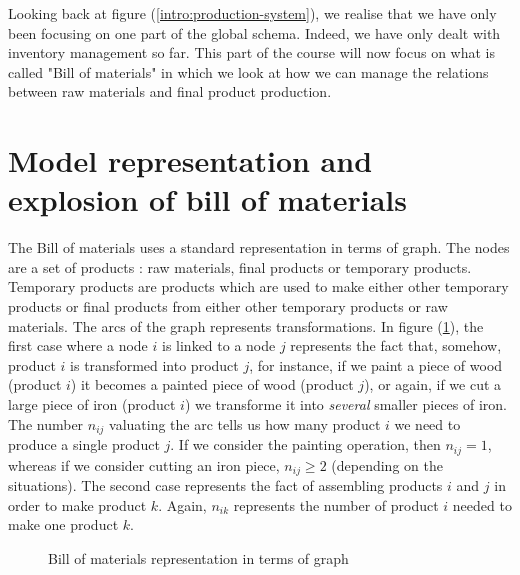 Looking back at figure (\ref{intro:production-system}), we realise that we have only been focusing on one part of the global schema. Indeed, we have only dealt with inventory management so far. This part of the course will now focus on what is called "Bill of materials" in which we look at how we can manage the relations between raw materials and final product production.

\section{Model representation and explosion of bill of materials}

The Bill of materials uses a standard representation in terms of graph. The nodes are a set of products : raw materials, final products or temporary products. Temporary products are products which are used to make either other temporary products or final products from either other temporary products or raw materials. The arcs of the graph represents transformations. In figure (\ref{without_st:representation}), the first case where a node $i$ is linked to a node $j$ represents the fact that, somehow, product $i$ is transformed into product $j$, for instance, if we paint a piece of wood (product $i$) it becomes a painted piece of wood (product $j$), or again, if we cut a large piece of iron (product $i$) we transforme it into \emph{several} smaller pieces of iron. The number $n_{ij}$ valuating the arc tells us how many product $i$ we need to produce a single product $j$. If we consider the painting operation, then $n_{ij}=1$, whereas if we consider cutting an iron piece, $n_{ij}\ge 2$ (depending on the situations). The second case represents the fact of assembling products $i$ and $j$ in order to make product $k$. Again, $n_{ik}$ represents the number of product $i$ needed to make one product $k$.

\begin{figure}[h!]
    \centering
    \caption{\label{without_st:representation}Bill of materials representation in terms of graph}
\end{figure}

